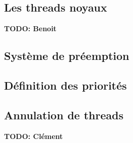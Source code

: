 \subsection{Les threads noyaux}

\textbf{TODO: Benoit}



\subsection{Système de préemption}



\subsection{Définition des priorités}


\subsection{Annulation de threads}
\textbf{TODO: Clément}


